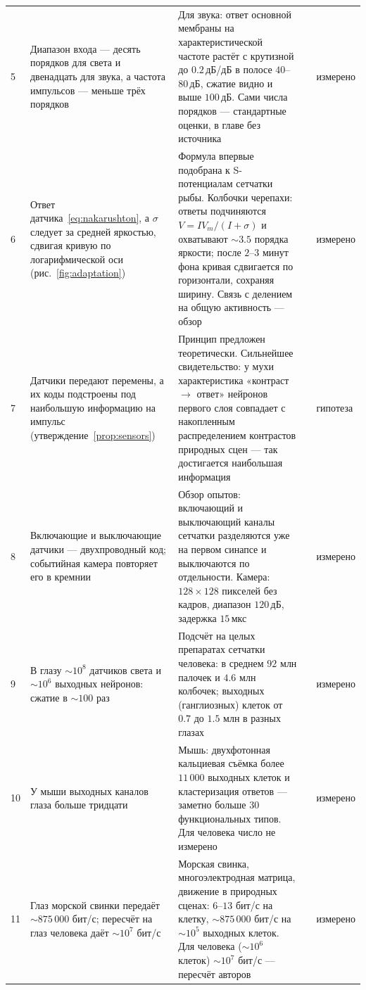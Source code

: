 {\begin{longtable}{>{\raggedright}p{0.5cm}>{\raggedright}p{4.0cm}>{\raggedright}p{5.6cm}>{\raggedright}p{2.3cm}>{\raggedright\arraybackslash}p{1.7cm}}
5 & Диапазон входа --- десять порядков для света и двенадцать для звука, а частота импульсов --- меньше трёх порядков & Для звука: ответ основной мембраны на характеристической частоте растёт с крутизной до $0.2$\,дБ/дБ в полосе $40$--$80$\,дБ, сжатие видно и выше $100$\,дБ. Сами числа порядков --- стандартные оценки, в главе без источника & \cite{Ruggero1997} & измерено \\
6 & Ответ датчика~\eqref{eq:nakarushton}, а $\sigma$ следует за средней яркостью, сдвигая кривую по логарифмической оси (рис.~\ref{fig:adaptation}) & Формула впервые подобрана к S-потенциалам сетчатки рыбы. Колбочки черепахи: ответы подчиняются $V=I V_m/(I+\sigma)$ и охватывают $\sim3.5$ порядка яркости; после $2$--$3$ минут фона кривая сдвигается по горизонтали, сохраняя ширину. Связь с делением на общую активность --- обзор & \cite{NakaRushton1966,NormannPerlman1979,Carandini2012} & измерено \\
7 & Датчики передают перемены, а их коды подстроены под наибольшую информацию на импульс (утверждение~\ref{prop:sensors}) & Принцип предложен теоретически. Сильнейшее свидетельство: у мухи характеристика «контраст $\to$ ответ» нейронов первого слоя совпадает с накопленным распределением контрастов природных сцен --- так достигается наибольшая информация & \cite{Barlow1961,Laughlin1981} & гипотеза \\
8 & Включающие и выключающие датчики --- двухпроводный код; событийная камера повторяет его в кремнии & Обзор опытов: включающий и выключающий каналы сетчатки разделяются уже на первом синапсе и выключаются по отдельности. Камера: $128\times128$ пикселей без кадров, диапазон $120$\,дБ, задержка $15$\,мкс & \cite{Schiller1992,Lichtsteiner2008,Gallego2022} & измерено \\
9 & В глазу $\sim10^8$ датчиков света и $\sim10^6$ выходных нейронов: сжатие в $\sim100$ раз & Подсчёт на целых препаратах сетчатки человека: в среднем $92$ млн палочек и $4.6$ млн колбочек; выходных (ганглиозных) клеток от $0.7$ до $1.5$ млн в разных глазах & \cite{Curcio1990,CurcioAllen1990} & измерено \\
10 & У мыши выходных каналов глаза больше тридцати & Мышь: двухфотонная кальциевая съёмка более $11\,000$ выходных клеток и кластеризация ответов --- заметно больше $30$ функциональных типов. Для человека число не измерено & \cite{Baden2016} & измерено \\
11 & Глаз морской свинки передаёт $\sim875\,000$ бит/с; пересчёт на глаз человека даёт $\sim10^7$ бит/с & Морская свинка, многоэлектродная матрица, движение в природных сценах: $6$--$13$ бит/с на клетку, $\sim875\,000$ бит/с на $\sim10^5$ выходных клеток. Для человека ($\sim10^6$ клеток) $\sim10^7$ бит/с --- пересчёт авторов & \cite{Koch2006} & измерено \\

\end{longtable}}
